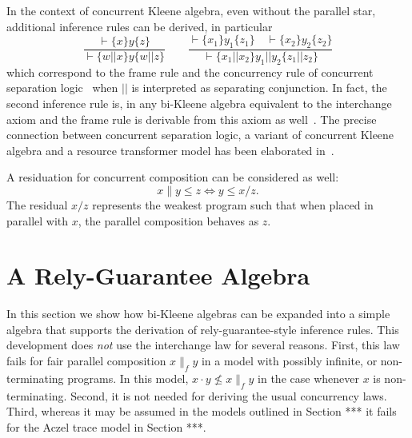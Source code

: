 \documentclass{llncs}
\begin{document}
In the context of concurrent Kleene algebra, even without the parallel
star, additional inference rules can be derived, in particular 
\begin{equation*}
  \frac{\vdash\{x\}y\{z\}}{\vdash\{w||x\}y\{w||z\}}\qquad \frac{\vdash\{x_1\}y_1\{z_1\}\quad\vdash\{x_2\}y_2\{z_2\}}{\vdash\{x_1||x_2\}y_1||y_2\{z_1||z_2\}}
\end{equation*}
which correspond to the frame rule and the concurrency rule of
concurrent separation logic~\cite{} when $||$ is interpreted as
separating conjunction. In fact, the second inference rule is, in any
bi-Kleene algebra equivalent to the interchange axiom and the frame
rule is derivable from this axiom as well~\cite{Hoareetal}. The
precise connection between concurrent separation logic, a variant of
concurrent Kleene algebra and a resource transformer model has been
elaborated in~\cite{localitypaper}.

A residuation for concurrent composition can be considered as well:
\begin{equation*}
x\|y \le z \Leftrightarrow y \le x/z.
\end{equation*}
The residual $x/z$ represents the weakest program such that when
placed in parallel with $x$, the parallel composition behaves as $z$.

\section{A  Rely-Guarantee Algebra}
\label{sec:RG}

In this section we show how bi-Kleene algebras can be expanded into a
simple algebra that supports the derivation of rely-guarantee-style
inference rules. This development does \emph{not} use the interchange
law for several reasons. First, this law fails for fair parallel
composition $x\parallel_f y$ in a model with possibly infinite, or
non-terminating programs. In this model, $x \cdot y \not\leq
x \parallel_f y$ in the case whenever $x$ is non-terminating. Second,
it is not needed for deriving the usual concurrency laws. Third,
whereas it may be assumed in the models outlined in Section *** it
fails for the Aczel trace model in Section ***. 


\end{document}
